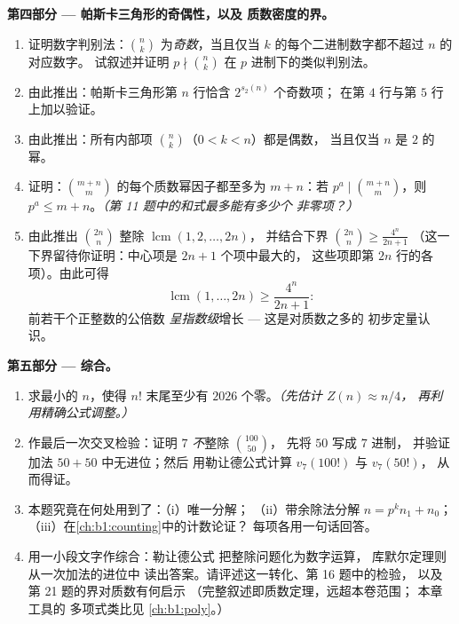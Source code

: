 \begin{problem}
\medskip
\noindent\textbf{第四部分 --- 帕斯卡三角形的奇偶性，以及
质数密度的界。}
\begin{enumerate}[resume]
  \item 证明数字判别法：$\binom nk$ 为\emph{奇数}，当且仅当
        $k$ 的每个二进制数字都不超过 $n$ 的对应数字。
        试叙述并证明 $p \nmid \binom nk$ 在
        $p$ 进制下的类似判别法。
  \item 由此推出：帕斯卡三角形第 $n$ 行恰含 $2^{s_2(n)}$ 个奇数项；
        在第 $4$ 行与第 $5$ 行上加以验证。
  \item 由此推出：所有内部项 $\binom nk$（$0 < k < n$）都是偶数，
        当且仅当 $n$ 是 $2$ 的幂。
  \item 证明：$\binom{m+n}m$ 的每个质数幂因子都至多为
        $m + n$：若 $p^a \mid \binom{m+n}m$，则 $p^a \leq
        m + n$。\emph{（第 11 题中的和式最多能有多少个
        非零项？）}
  \item 由此推出 $\binom{2n}n$ 整除 $\operatorname{lcm}(1, 2, \dots, 2n)$，
        并结合下界
        $\binom{2n}n \geq \frac{4^n}{2n+1}$
        （这一下界留待你证明：中心项是 $2n + 1$ 个项中最大的，
        这些项即第 $2n$ 行的各项）。由此可得
        \[
        \operatorname{lcm}(1, \dots, 2n) \geq \frac{4^n}{2n+1} :
        \]
        前若干个正整数的公倍数
        \emph{呈指数级}增长 --- 这是对质数之多的
        初步定量认识。
\end{enumerate}

\medskip
\noindent\textbf{第五部分 --- 综合。}
\begin{enumerate}[resume]
  \item 求最小的 $n$，使得 $n!$ 末尾至少有
        $2026$ 个零。\emph{（先估计 $Z(n) \approx n/4$，
        再利用精确公式调整。）}
  \item 作最后一次交叉检验：证明 $7$ \emph{不}整除 $\binom{100}{50}$，
        先将 $50$ 写成 $7$ 进制，
        并验证加法 $50 + 50$ 中无进位；然后
        用勒让德公式计算 $v_7(100!)$ 与 $v_7(50!)$，
        从而得证。
  \item 本题究竟在何处用到了：（i）唯一分解；
        （ii）带余除法分解 $n = p^k n_1 + n_0$；
        （iii）在\cref{ch:b1:counting}中的计数论证？
        每项各用一句话回答。
  \item 用一小段文字作综合：勒让德公式
        把整除问题化为数字运算，
        库默尔定理则从一次加法的进位中
        读出答案。请评述这一转化、第 16 题中的检验，
        以及第 21 题的界对质数有何启示
        （完整叙述即质数定理，远超本卷范围；
        本章工具的
        多项式类比见
        \cref{ch:b1:poly}。）
\end{enumerate}
\end{problem}
